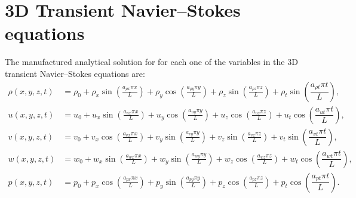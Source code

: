 \documentclass[10pt]{article}
\begin{document}
\section{3D Transient Navier--Stokes equations}

The manufactured analytical solution for for each one of the variables in the 3D transient Navier--Stokes equations are:
\begin{equation}
\begin{split}
\label{eq:manufactured_3d}
\rho\left( x ,y ,z,t\right) &=  \rho_{0}+ \rho_{x} \sin\left(\frac{a_{ \rho  x} \pi x}{L}\right)+ \rho_{y} \cos\left(\frac{a_{ \rho  y} \pi y}{L}\right) + \rho_{z} \sin\left(\frac{a_{ \rho  z} \pi z}{L}\right) + \rho_t \sin\left(\dfrac{a_{\rho t} \pi t}{L}\right),\\
u\left( x ,y ,z,t\right) &= u_{0}+u_{x} \sin\left(\frac{a_{u  x} \pi x}{L}\right)+u_{y} \cos\left(\frac{a_{u  y} \pi y}{L}\right)+u_{z} \cos\left(\frac{a_{u  z} \pi z}{L}\right) + u_t \cos\left(\dfrac{a_{u t} \pi t}{L}\right),\\
v\left( x ,y ,z,t\right) &= v_{0}+v_{x} \cos\left(\frac{a_{v  x} \pi x}{L}\right)+v_{y} \sin\left(\frac{a_{v  y} \pi y}{L}\right)+v_{z} \sin\left(\frac{a_{v  z} \pi z}{L}\right)+ v_t \sin\left(\dfrac{a_{v t} \pi t}{L}\right), \\
w\left( x ,y ,z,t\right) &= w_{0}+w_{x} \sin\left(\frac{a_{w  x} \pi x}{L}\right)+w_{y} \sin\left(\frac{a_{w  y} \pi y}{L}\right)+ w_{z} \cos\left(\frac{a_{w  z} \pi z}{L}\right)+ w_t \cos\left(\dfrac{a_{w t} \pi t}{L}\right) ,\\
p\left( x ,y ,z,t\right) &= p_{0}+p_{x} \cos\left(\frac{a_{p  x} \pi x}{L}\right)+p_{y} \sin\left(\frac{a_{p  y} \pi y}{L}\right)+ p_{z} \cos\left(\frac{a_{p  z} \pi z}{L}\right)+ p_t \cos\left(\dfrac{a_{p t} \pi t}{L}\right).\\
\end{split}
\end{equation}
\end{document}
